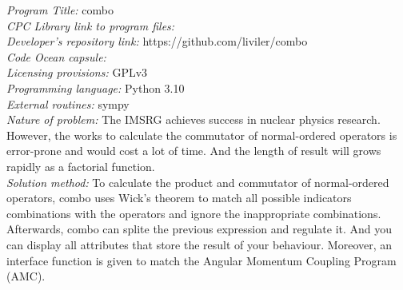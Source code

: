 \documentclass[final,3p,times]{elsarticle}
\begin{document}
\begin{small}
\noindent
{\em Program Title:} combo                                      \\
{\em CPC Library link to program files:}  \\
{\em Developer's repository link:} https://github.com/liviler/combo \\
{\em Code Ocean capsule:}\\
{\em Licensing provisions:} GPLv3\\
{\em Programming language:} Python 3.10                                 \\
{\em External routines:} sympy  \\
{\em Nature of problem:}
The IMSRG achieves success in nuclear physics research.
However, the works to calculate the commutator of normal-ordered operators is  error-prone and would cost a lot of time. And the length of result will grows rapidly as a factorial function.\\
{\em Solution method:}
To calculate the product and commutator of normal-ordered operators, combo uses Wick's theorem to match all possible indicators combinations with the operators and ignore the inappropriate combinations.
Afterwards, combo can splite the previous expression and regulate it. And you can display all attributes that store the result of your behaviour.
Moreover, an interface function is given to match the Angular Momentum Coupling
Program (AMC).


\end{small}
\end{document}
